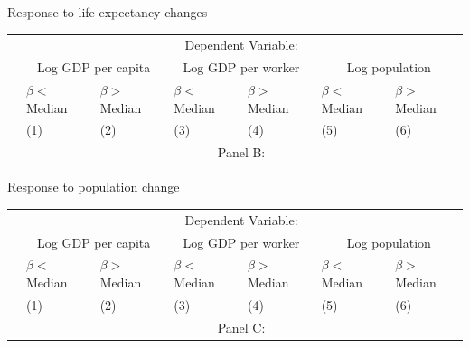 \documentclass[10pt, xcolor=dvipsnames]{beamer}
\begin{document}
\begin{frame}{Response to life expectancy changes}

{\footnotesize
\begin{tabularx}{\textwidth}{lXXXXXX}
\midrule
 & \multicolumn{6}{c}{Dependent Variable:} \\ \cmidrule(lr){2-7}
 & \multicolumn{2}{c}{Log GDP per capita} & \multicolumn{2}{c}{Log GDP per worker} & \multicolumn{2}{c}{Log population} \\ \cmidrule(lr){2-3} \cmidrule(lr){4-5} \cmidrule(lr){6-7}
 & $\beta<$Median & $\beta>$Median & $\beta<$Median & $\beta>$Median & $\beta<$Median & $\beta>$Median \\
 & (1) & (2) & (3) & (4) & (5) & (6) \\
\midrule
 & \multicolumn{6}{c}{Panel B:} \\ \cmidrule(lr){2-7}

\midrule

\end{tabularx}
}
\end{frame}

\begin{frame}{Response to population change}

{\footnotesize
\begin{tabularx}{\textwidth}{lXXXXXX}
\midrule
 & \multicolumn{6}{c}{Dependent Variable:} \\ \cmidrule(lr){2-7}
 & \multicolumn{2}{c}{Log GDP per capita} & \multicolumn{2}{c}{Log GDP per worker} & \multicolumn{2}{c}{Log population} \\ \cmidrule(lr){2-3} \cmidrule(lr){4-5} \cmidrule(lr){6-7}
 & $\beta<$Median & $\beta>$Median & $\beta<$Median & $\beta>$Median & $\beta<$Median & $\beta>$Median \\
 & (1) & (2) & (3) & (4) & (5) & (6) \\
\midrule
 & \multicolumn{6}{c}{Panel C:} \\ \cmidrule(lr){2-7}

\midrule

\end{tabularx}
}

\hfill \hyperlink{aj}{}
\end{frame}
\end{document}

